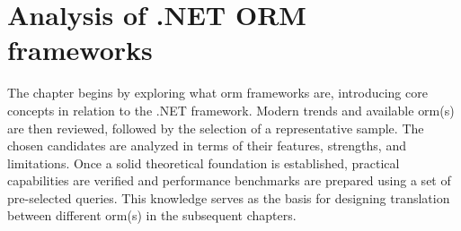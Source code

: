 \chapter{Analysis of .NET ORM frameworks}
\label{chapter:ormcomparison}

The chapter begins by exploring what \acrshort{orm} frameworks are, introducing core concepts in relation to the .NET framework. Modern trends and available \acrshort{orm}(s) are then reviewed, followed by the selection of a representative sample. The chosen candidates are analyzed in terms of their features, strengths, and limitations. Once a solid theoretical foundation is established, practical capabilities are verified and performance benchmarks are prepared using a set of pre-selected queries. This knowledge serves as the basis for designing translation between different \acrshort{orm}(s) in the subsequent chapters.







